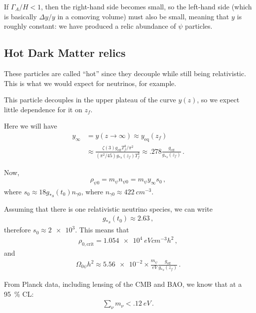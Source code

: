 \documentclass[main.tex]{subfiles}
\begin{document}
If \(\Gamma _A / H <1\), then the right-hand side becomes small, so the left-hand side (which is basically \(\Delta y / y\) in a comoving volume) must also be small, meaning that \(y\) is roughly constant: we have produced a relic abundance of \(\psi \) particles.

\subsection{Hot Dark Matter relics}

These particles are called ``hot'' since they decouple while still being relativistic. This is what we would expect for neutrinos, for example. 

This particle decouples in the upper plateau of the curve \(y(z)\), so we expect little dependence for it on \(z_f\). 

Here we will have 
%
\begin{align}
y_\infty &= y(z \to \infty ) \approx y _{\text{eq}} (z_f)  \\
&\approx \frac{\zeta (3) g _{\text{eff}}T_f^3 / \pi^2}{(\pi^2 / 45) g_{*s } (z_f) T_f^3} \approx \num{.278} \frac{g _{\text{eff}}}{g_{*s} (z_f)}
\,.
\end{align}

Now, 
%
\begin{align}
\rho_{\psi 0 } = m_\psi n_{\psi 0 } = m_\psi y_\infty s_0 
\,,
\end{align}
%
where \(s_0 \approx 18 g_{*s} (t_0 ) n_{\gamma 0 }\), where \(n_{\gamma 0} \approx \SI{422}{cm^{-3}}\). 

Assuming that there is one relativistic neutrino species, we can write 
%
\begin{align}
g_{*s} (t_0) \approx \num{2.63}
\,,
\end{align}
%
therefore \(s_0  \approx \num{2e3}\). 
This means that 
%
\begin{align}
\rho_{0, \text{crit}} = \SI{1.054e4}{eV cm^{-3}} h^2
\,,
\end{align}
%
and 
%
\begin{align}
\Omega_{0 \psi } h^2 \approx \num{5.56e-2} \times \frac{m_\psi }{\SI{}{eV}} \frac{g _{\text{eff}}}{g_{*s} (z_f)}
\,.
\end{align}

From Planck data, including lensing of the CMB and BAO, we know that at a \SI{95}{\percent} CL: 
%
\begin{align}
\sum _{\nu } m_\nu < \SI{.12}{eV}
\,.
\end{align}
\end{document}
